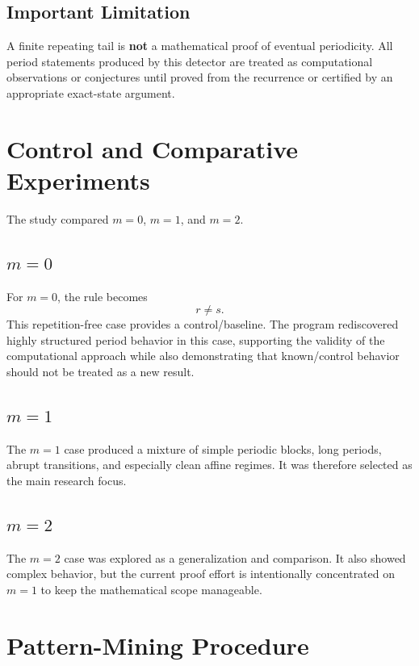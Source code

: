\documentclass[11pt]{article}
\begin{document}
\subsection{Important Limitation}

A finite repeating tail is \textbf{not} a mathematical proof of eventual periodicity. All period statements produced by this detector are treated as computational observations or conjectures until proved from the recurrence or certified by an appropriate exact-state argument.

\section{Control and Comparative Experiments}

The study compared $m=0$, $m=1$, and $m=2$.

\subsection{$m=0$}
For $m=0$, the rule becomes
\begin{equation}
    r\ne s.
\end{equation}
This repetition-free case provides a control/baseline. The program rediscovered highly structured period behavior in this case, supporting the validity of the computational approach while also demonstrating that known/control behavior should not be treated as a new result.

\subsection{$m=1$}
The $m=1$ case produced a mixture of simple periodic blocks, long periods, abrupt transitions, and especially clean affine regimes. It was therefore selected as the main research focus.

\subsection{$m=2$}
The $m=2$ case was explored as a generalization and comparison. It also showed complex behavior, but the current proof effort is intentionally concentrated on $m=1$ to keep the mathematical scope manageable.

\section{Pattern-Mining Procedure}
\end{document}
